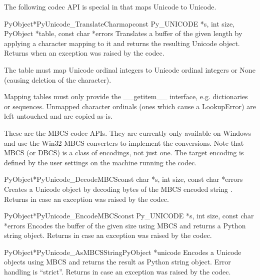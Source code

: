 \documentclass{manual}
\begin{document}
The following codec API is special in that maps Unicode to Unicode.

\begin{cfuncdesc}{PyObject*}{PyUnicode_TranslateCharmap}{const Py_UNICODE *s,
                                               int size,
                                               PyObject *table,
                                               const char *errors}
Translates a  buffer of the given length by applying
a character mapping  to it and returns the resulting
Unicode object.  Returns \NULL{} when an exception was raised by the
codec.

The  table must map Unicode ordinal integers to Unicode
ordinal integers or None (causing deletion of the character).

Mapping tables must only provide the __getitem__ interface,
e.g. dictionaries or sequences. Unmapped character ordinals (ones
which cause a LookupError) are left untouched and are copied as-is.
\end{cfuncdesc}


These are the MBCS codec APIs. They are currently only available on
Windows and use the Win32 MBCS converters to implement the
conversions.  Note that MBCS (or DBCS) is a class of encodings, not
just one.  The target encoding is defined by the user settings on the
machine running the codec.

\begin{cfuncdesc}{PyObject*}{PyUnicode_DecodeMBCS}{const char *s,
                                               int size,
                                               const char *errors}
Creates a Unicode object by decoding  bytes of the MBCS
encoded string .  Returns \NULL{} in case an exception was
raised by the codec.
\end{cfuncdesc}

\begin{cfuncdesc}{PyObject*}{PyUnicode_EncodeMBCS}{const Py_UNICODE *s,
                                               int size,
                                               const char *errors}
Encodes the  buffer of the given size using MBCS
and returns a Python string object.  Returns \NULL{} in case an
exception was raised by the codec.
\end{cfuncdesc}

\begin{cfuncdesc}{PyObject*}{PyUnicode_AsMBCSString}{PyObject *unicode}
Encodes a Unicode objects using MBCS and returns the result as Python
string object.  Error handling is ``strict''.  Returns \NULL{} in case
an exception was raised by the codec.
\end{cfuncdesc}
\end{document}
